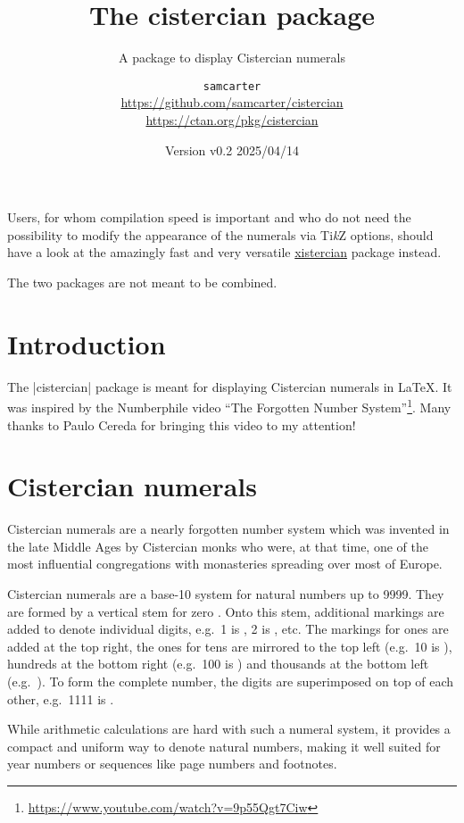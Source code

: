 \documentclass{scrartcl}
\title{The cistercian package}
\subtitle{A package to display Cistercian numerals}
\author{%
  \texorpdfstring{
    \texttt{samcarter}\\
    \url{https://github.com/samcarter/cistercian}\\
    \url{https://ctan.org/pkg/cistercian}
  }{samcarter}}
\date{Version v0.2 \textendash{} 2025/04/14}
\begin{document}
\maketitle
\thispagestyle{scrheadings}

\begin{tcolorbox}[width=.8\textwidth,center,sidebyside=false,title={Note}]
Users, for whom compilation speed is important and who do not need the possibility to modify the appearance of the numerals via Ti\emph{k}Z options, should have a look at the amazingly fast and very versatile \href{https://ctan.org/pkg/xistercian}{xistercian} package instead.

The two packages are not meant to be combined.
\end{tcolorbox}

\section{Introduction}

The \saminline|cistercian| package is meant for displaying Cistercian numerals in \LaTeX{}.
It was inspired by the Numberphile video ``The Forgotten Number System''\footnote{\url{https://www.youtube.com/watch?v=9p55Qgt7Ciw}}. Many thanks to Paulo Cereda for bringing this video to my attention!

\blurb*

\section{Cistercian numerals}

Cistercian numerals are a nearly forgotten number system which was invented in the late Middle Ages by Cistercian monks who were, at that time, one of the most influential congregations with monasteries spreading over most of Europe.

Cistercian numerals are a base-10 system for natural numbers up to 9999.
They are formed by a vertical stem for zero .
Onto this stem, additional markings are added to denote individual digits, e.g.\ 1 is , 2 is , etc.
The markings for ones are added at the top right, the ones for tens are mirrored to the top left (e.g.\ 10 is ), hundreds at the bottom right (e.g.\ 100 is ) and thousands at the bottom left (e.g.\ ).
To form the complete number, the digits are superimposed on top of each other, e.g.\ 1111 is .

While arithmetic calculations are hard with such a numeral system, it provides a compact and uniform way to denote natural numbers, making it well suited for year numbers or sequences like page numbers and footnotes. 
\end{document}
